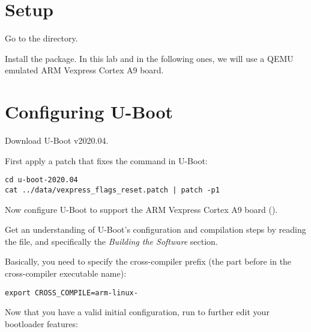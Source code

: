 
\section{Setup}

Go to the  directory.

Install the  package. In this lab and in the
following ones, we will use a QEMU emulated ARM Vexpress Cortex A9 board.

\section{Configuring U-Boot}

Download U-Boot v2020.04.

First apply a patch that fixes the  command in U-Boot:
\begin{verbatim}
cd u-boot-2020.04
cat ../data/vexpress_flags_reset.patch | patch -p1
\end{verbatim}

Now configure U-Boot to support the ARM Vexpress Cortex A9 board
().

Get an understanding of U-Boot's configuration and compilation steps
by reading the  file, and specifically the {\em Building
the Software} section.

Basically, you need to specify the cross-compiler prefix
(the part before  in the cross-compiler executable name):
\begin{verbatim}
export CROSS_COMPILE=arm-linux-
\end{verbatim}

Now that you have a valid initial configuration, run 
to further edit your bootloader features:

